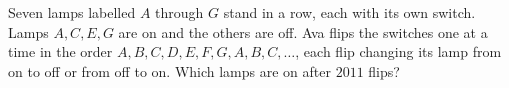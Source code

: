 Seven lamps labelled $A$ through $G$ stand in a row, each with its own switch. Lamps $A,C,E,G$ are on and the others are off. Ava flips the switches one at a time in the order $A,B,C,D,E,F,G,A,B,C,\dots$, each flip changing its lamp from on to off or from off to on. Which lamps are on after $2011$ flips?
